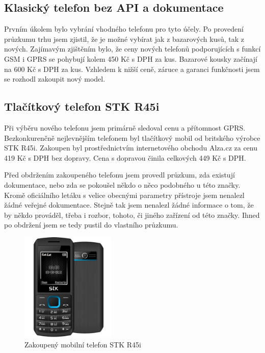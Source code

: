 \documentclass[FM,DP]{tulthesis}  %
\begin{document}
\subsection{Klasický telefon bez API a dokumentace}
Prvním úkolem bylo vybrání vhodného telefonu pro tyto účely. Po provedení průzkumu trhu jsem zjistil, že je možné vybírat jak z bazarových kusů, tak z nových. Zajímavým zjištěním bylo, že ceny nových telefonů podporujících s funkcí GSM i GPRS se pohybují kolem 450 Kč s DPH za kus. Bazarové kousky začínají na 600 Kč s DPH za kus. Vzhledem k nižší ceně, záruce a garanci funkčnosti jsem se rozhodl zakoupit nový model.

\subsection{Tlačítkový telefon STK R45i}
Při výběru nového telefonu jsem primárně sledoval cenu a přítomnost GPRS. Bezkonkurenčně nejlevnějším telefonem byl tlačítkový mobil od britského výrobce STK R45i. Zakoupen byl prostřednictvím internetového obchodu Alza.cz za cenu 419 Kč s DPH bez dopravy. Cena s dopravou činila celkových 449 Kč s DPH.

Před obdržením zakoupeného telefonu jsem provedl průzkum, zda existují dokumentace, nebo zda se pokoušel někdo o něco podobného u této značky. Kromě oficiálního letáku s velice obecnými parametry přístroje jsem nenalezl žádné veřejné dokumentace. Stejně tak jsem nenalezl žádné informace o tom, že by někdo prováděl, třeba i rozbor, tohoto, či jiného zařízení od této značky. Ihned po obdržení jsem se tedy pustil do vlastního průzkumu.

\begin{figure}[H]
\begin{center}
\includegraphics[width=0.4\textwidth]{images/phone.png}
\caption{Zakoupený mobilní telefon STK R45i}
\label{image}
\end{center}
\end{figure}
\end{document}
